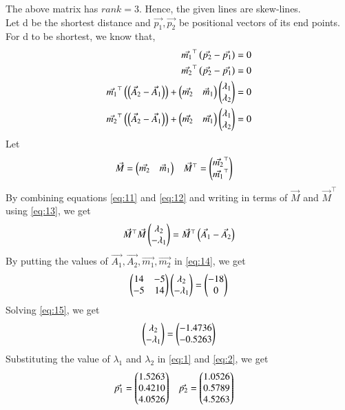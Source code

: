 \documentclass[journal,12pt,twocolumn]{IEEEtran}
\begin{document}
The above matrix has $rank = 3$. Hence, the given lines are skew-lines.\\
Let d be the shortest distance and $\Vec{p_{1}}, \Vec{p_{2}}$ be positional vectors of its end points.
For d to be shortest, we know that,
\begin{align}
    \label{eq:9}
    \Vec{m_{1}}^\top\left(\Vec{p_{2}}-\Vec{p_{1}}\right)=0\\
    \label{eq:10}
     \Vec{m_{2}}^\top\left(\Vec{p_{2}}-\Vec{p_{1}}\right)=0\\
     \label{eq:11}
     \Vec{m_{1}}^\top\left(\left(\Vec{A}_{2} - \Vec{A}_{1}\right)\right)+\begin{pmatrix}\Vec{m_{2}} & \Vec{m}_{1}\end{pmatrix}\begin{pmatrix}\lambda_{1} \\ \lambda_{2}\end{pmatrix}=0\\
     \label{eq:12}
     \Vec{m_{2}}^\top\left(\left(\Vec{A}_{2} - \Vec{A}_{1}\right)\right)+\begin{pmatrix}\Vec{m_{2}} & \Vec{m_{1}}\end{pmatrix}\begin{pmatrix}\lambda_{1} \\ \lambda_{2}\end{pmatrix}=0
\end{align}
Let 
\begin{align}
\label{eq:13}
    \Vec{M}&=\begin{pmatrix}\Vec{m_{2}} & \Vec{m}_{1}\end{pmatrix} & \Vec{M}^\top&=\begin{pmatrix}\Vec{m_{2}}^\top \\ \Vec{m_{1}}^\top\end{pmatrix}
\end{align}
By combining equations \eqref{eq:11} and \eqref{eq:12} and writing in terms of $\Vec{M}$ and $\Vec{M}^\top$ using \eqref{eq:13}, we get
\begin{align}
    \label{eq:14}
    \Vec{M}^\top\Vec{M}\begin{pmatrix}\lambda_{2} \\ -\lambda_{1}\end{pmatrix}= \Vec{M}^\top\left(\Vec{A}_{1} - \Vec{A}_{2}\right)
\end{align}
By putting the values of $\vec{A_1},\vec{A_2},\vec{m_1},\vec{m_2}$ in \eqref{eq:14}, we get
\begin{align}
    \label{eq:15}
    \begin{pmatrix}14 & -5 \\ -5 & 14\end{pmatrix}\begin{pmatrix}\lambda_{2} \\ -\lambda_{1}\end{pmatrix}=\begin{pmatrix}-18 \\ 0\end{pmatrix}
\end{align}
Solving \eqref{eq:15}, we get
\begin{align}
    \label{eq:16}
    \begin{pmatrix}\lambda_{2} \\ -\lambda_{1}\end{pmatrix}=\begin{pmatrix}-1.4736 \\ -0.5263\end{pmatrix}
\end{align}
Substituting the value of $\lambda_{1}$ and $\lambda_{2}$ in \eqref{eq:1} and \eqref{eq:2}, we get
\begin{align}
    \label{eq:17}
    \Vec{p_{1}} &= \begin{pmatrix}1.5263\\ 0.4210 \\ 4.0526 \end{pmatrix}   &    \Vec{p_{2}}&=\begin{pmatrix} 1.0526\\0.5789\\4.5263\end{pmatrix}
\end{align}
\end{document}
